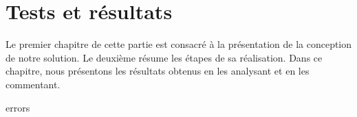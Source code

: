 \chapter{Tests et résultats}%
\label{chap.results}

Le premier chapitre de cette partie est consacré à la présentation de la conception de notre solution.
Le deuxième résume les étapes de sa réalisation.
Dans ce chapitre, nous présentons les résultats obtenus en les analysant et en les commentant.

{errors}